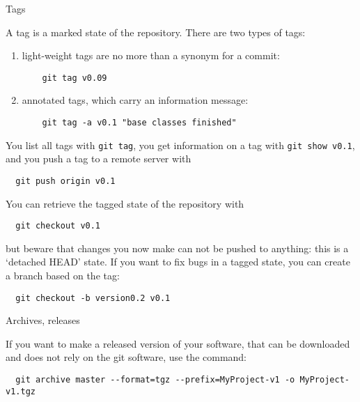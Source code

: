  {Tags}

A tag is a marked state of the repository.
There are two types of tags:
\begin{enumerate}
\item light-weight tags are no more than a synonym for a commit:
  \begin{lstlisting}
    git tag v0.09
  \end{lstlisting}
\item annotated tags, which carry an information message:
  \begin{lstlisting}
    git tag -a v0.1 "base classes finished"
  \end{lstlisting}
\end{enumerate}

You list all tags with \lstinline{git tag},
you get information on a tag with \lstinline{git show v0.1},
and you push a tag to a remote server with
\begin{lstlisting}
  git push origin v0.1
\end{lstlisting}

You can retrieve the tagged state of the repository with
\begin{lstlisting}
  git checkout v0.1
\end{lstlisting}
but beware that changes you now make can not be pushed to anything:
this is a `detached HEAD' state.
If you want to fix bugs in a tagged state,
you can create a branch based on the tag:
\begin{lstlisting}
  git checkout -b version0.2 v0.1
\end{lstlisting}

 {Archives, releases}


If you want to make a released version of your software,
that can be downloaded and does not rely on the git software,
use the  command:
\begin{lstlisting}
  git archive master --format=tgz --prefix=MyProject-v1 -o MyProject-v1.tgz
\end{lstlisting}

\endinput

\Level 0 {Conflicts}

\begin{purpose}
  In this section you will learn about how do deal with conflicting
  edits by two users of the same repository.
\end{purpose}

